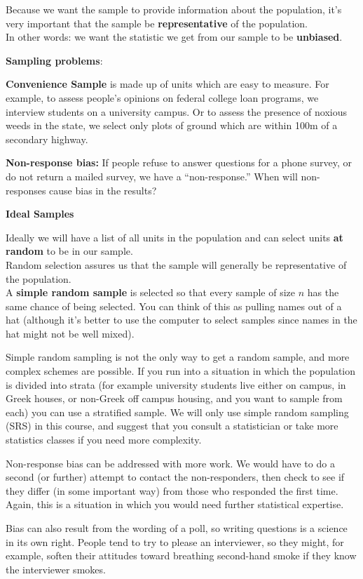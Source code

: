 Because we want the sample to provide information about the
population, it's very important that the sample be {\bf
  representative} of the population. \\
In other words: we want the statistic we get from our sample to be
{\bf unbiased}.\\

\begin{center}
  {\bf Sampling problems}:\vspace{-.5cm}
\end{center}
\begin{list}{}{}
\item [\bf Convenience Sample]  is made up of units which are easy to
  measure. For example, to assess people's opinions on federal college
  loan programs, we interview students on a university campus.  Or to
  assess the presence of noxious weeds in the state, we select only plots
  of ground which are within 100m of a secondary highway. 
\item [\bf Non-response bias:] If people refuse to answer questions
  for a phone survey, or do not return a mailed survey, we have a
  ``non-response.'' When will non-responses cause bias in the results?
\end{list}

\begin{center}
  {\bf Ideal Samples}
\end{center}
 Ideally we will have a list of all units in the population and can
 select units {\bf at random} to be in our sample.\\ 
Random selection assures us that the sample will generally be
representative of the population.\\
 A {\bf simple random sample} is selected so that every sample of size
 $n$ has the same chance of being selected.  You can think of this as
 pulling names out of a hat (although it's better to use the computer
 to select samples since names in the hat might not be well mixed). 

  Simple random sampling is not the only way to get a random
  sample, and more complex schemes are possible.  If you run into a
  situation in which the population is divided into strata (for
  example university students live either on campus, in Greek houses,
  or non-Greek off campus housing, and you want to sample from each)
  you can use a stratified sample.  We will only use simple random
  sampling (SRS) in this course, and suggest that you consult a
  statistician or take more statistics classes if you need more
  complexity. 

 Non-response bias can be addressed with more work.  We would have to
 do a second (or further) attempt to contact the non-responders, then 
 check to see if they differ (in some important way) from those who
 responded the first time.  Again, this is a situation in which you
 would need further statistical expertise.

 Bias can also result from the wording of a poll, so writing questions
 is a science in its own right.  People tend to try
 to please an interviewer, so they might, for example, soften their
 attitudes toward breathing second-hand smoke if they know the interviewer
 smokes. 


